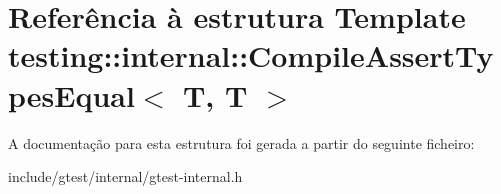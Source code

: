 \hypertarget{structtesting_1_1internal_1_1CompileAssertTypesEqual_3_01T_00_01T_01_4}{\section{Referência à estrutura Template testing\-:\-:internal\-:\-:Compile\-Assert\-Types\-Equal$<$ T, T $>$}
\label{structtesting_1_1internal_1_1CompileAssertTypesEqual_3_01T_00_01T_01_4}
}


A documentação para esta estrutura foi gerada a partir do seguinte ficheiro\-:\begin{DoxyCompactItemize}
\item 
include/gtest/internal/gtest-\/internal.\-h\end{DoxyCompactItemize}

